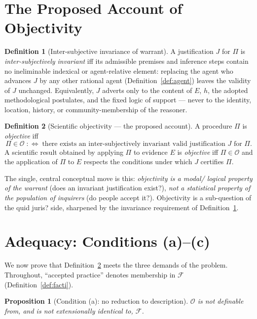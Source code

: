 \documentclass{amsart}
\theoremstyle{definition}
\newtheorem{definition}{Definition}
\theoremstyle{plain}
\newtheorem{proposition}{Proposition}
\begin{document}
\section{The Proposed Account of Objectivity}

\begin{definition}[Inter-subjective invariance of warrant]\label{def:invariance}
A justification $J$ for $\Pi$ is \emph{inter-subjectively invariant} iff its
admissible premises and inference steps contain no ineliminable indexical or
agent-relative element: replacing the agent who advances $J$ by any other
rational agent (Definition~\ref{def:agent}) leaves the validity of $J$
unchanged. Equivalently, $J$ adverts only to the content of $E$, $h$, the
adopted methodological postulates, and the fixed logic of support --- never to
the identity, location, history, or community-membership of the reasoner.
\end{definition}

\begin{definition}[Scientific objectivity --- the proposed account]
\label{def:objectivity}
A procedure $\Pi$ is \emph{objective} iff
\[
\Pi \in \mathcal{O} \;:\Longleftrightarrow\;
\text{there exists an inter-subjectively invariant valid justification } J
\text{ for } \Pi .
\]
A scientific result obtained by applying $\Pi$ to evidence $E$ is
\emph{objective} iff $\Pi \in \mathcal{O}$ and the application of $\Pi$ to $E$
respects the conditions under which $J$ certifies $\Pi$.
\end{definition}

The single, central conceptual move is this: \emph{objectivity is a modal\slash
logical property of the warrant} (does an invariant justification exist?),
\emph{not a statistical property of the population of inquirers} (do people
accept it?). Objectivity is a sub-question of the quid juris? side, sharpened
by the invariance requirement of Definition~\ref{def:invariance}.

\section{Adequacy: Conditions (a)--(c)}

We now prove that Definition~\ref{def:objectivity} meets the three demands of
the problem. Throughout, ``accepted practice'' denotes membership in
$\mathcal{F}$ (Definition~\ref{def:facti}).

\begin{proposition}[Condition (a): no reduction to description]
\label{prop:a}
$\mathcal{O}$ is not definable from, and is not extensionally identical to,
$\mathcal{F}$.
\end{proposition}
\end{document}
